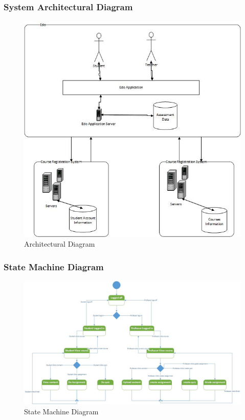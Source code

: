 \documentclass{beamer}
\begin{document}
\begin{frame}
	\frametitle{System Architectural Diagram}
	\begin{figure}[!ht]
		\begin{center}
			\includegraphics[width=\textwidth,height=0.7\textheight,keepaspectratio]{archi}
		\end{center}
		\caption{Architectural Diagram}
	\end{figure}
	
\end{frame}



\begin{frame}
	\frametitle{State Machine Diagram}
	\begin{figure}[!ht]
		\begin{center}
			\includegraphics[width=\textwidth,height=0.7\textheight,keepaspectratio]{state}
		\end{center}
		\caption{State Machine Diagram}
	\end{figure}
\end{frame}
\end{document}
